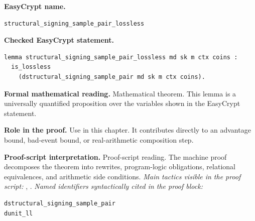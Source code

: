 \begin{formaltheorem}
\noindent\textbf{EasyCrypt name.}
\begin{lstlisting}[language=EasyCrypt,basicstyle=\ttfamily\scriptsize]
structural_signing_sample_pair_lossless
\end{lstlisting}
\noindent\textbf{Checked EasyCrypt statement.}
\begin{lstlisting}[language=EasyCrypt,basicstyle=\ttfamily\scriptsize]
lemma structural_signing_sample_pair_lossless md sk m ctx coins :
  is_lossless
    (dstructural_signing_sample_pair md sk m ctx coins).
\end{lstlisting}
\noindent\textbf{Formal mathematical reading.}
Mathematical theorem. This lemma is a universally quantified proposition over the variables shown in the EasyCrypt statement.

\noindent\textbf{Role in the proof.}
Use in this chapter. It contributes directly to an advantage bound, bad-event bound, or real-arithmetic composition step.

\noindent\textbf{Proof-script interpretation.}
Proof-script reading. The machine proof decomposes the theorem into rewrites, program-logic obligations, relational equivalences, and arithmetic side conditions.
\emph{Main tactics visible in the proof script:} , .
\emph{Named identifiers syntactically cited in the proof block:}
\begin{lstlisting}[language=EasyCrypt,basicstyle=\ttfamily\scriptsize]
dstructural_signing_sample_pair
dunit_ll
\end{lstlisting}

\end{formaltheorem}

